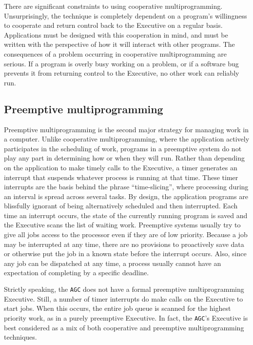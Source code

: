 \documentclass[refcap, oxford]{ahsan}
\begin{document}
There are significant constraints to using cooperative multiprogramming. Unsurprisingly, the technique is completely dependent on a program's willingness to cooperate and return control back to the Executive on a regular basis. Applications must be designed with this cooperation in mind, and must be written with the perspective of how it will interact with other programs. The consequences of a problem occurring in cooperative multiprogramming are serious. If a program is overly busy working on a problem, or if a software bug prevents it from returning control to the Executive, no other work can reliably run.


\subsection{Preemptive multiprogramming}

Preemptive multiprogramming is the second major strategy for managing work in a computer. Unlike cooperative multiprogramming, where the application actively participates in the scheduling of work, programs in a preemptive system do not play any part in determining how or when they will run. Rather than depending on the application to make timely calls to the Executive, a timer generates an interrupt that suspends whatever process is running at that time. These timer interrupts are the basis behind the phrase ``time-slicing'', where processing during an interval is spread across several tasks. By design, the application programs are blissfully ignorant of being alternatively scheduled and then interrupted. Each time an interrupt occurs, the state of the currently running program is saved and the Executive scans the list of waiting work. Preemptive systems usually try to give all jobs access to the processor even if they are of low priority. Because a job may be interrupted at any time, there are no provisions to proactively save data or otherwise put the job in a known state before the interrupt occurs. Also, since any job can be dispatched at any time, a process usually cannot have an expectation of completing by a specific deadline.

Strictly speaking, the \texttt{AGC} does not have a formal preemptive multiprogramming Executive. Still, a number of timer interrupts do make calls on the Executive to start jobs. When this occurs, the entire job queue is scanned for the highest priority work, as in a purely preemptive Executive. In fact, the \texttt{AGC}'s Executive is best considered as a mix of both cooperative and preemptive multiprogramming techniques.
\end{document}
